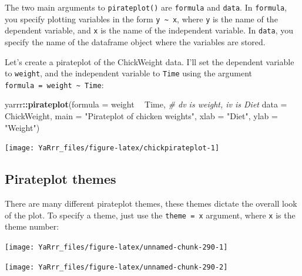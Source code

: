 \documentclass[]{book}
\newenvironment{Shaded}{\begin{snugshade}}{\end{snugshade}}
\newcommand{\KeywordTok}[1]{\textcolor[rgb]{0.13,0.29,0.53}{\textbf{#1}}}
\newcommand{\DataTypeTok}[1]{\textcolor[rgb]{0.13,0.29,0.53}{#1}}
\newcommand{\StringTok}[1]{\textcolor[rgb]{0.31,0.60,0.02}{#1}}
\newcommand{\CommentTok}[1]{\textcolor[rgb]{0.56,0.35,0.01}{\textit{#1}}}
\newcommand{\OperatorTok}[1]{\textcolor[rgb]{0.81,0.36,0.00}{\textbf{#1}}}
\newcommand{\NormalTok}[1]{#1}
\theoremstyle{definition}
\theoremstyle{definition}
\theoremstyle{remark}
\begin{document}
The two main arguments to \texttt{pirateplot()} are \texttt{formula} and
\texttt{data}. In \texttt{formula}, you specify plotting variables in
the form \texttt{y\ \textasciitilde{}\ x}, where \texttt{y} is the name
of the dependent variable, and \texttt{x} is the name of the independent
variable. In \texttt{data}, you specify the name of the dataframe object
where the variables are stored.

Let's create a pirateplot of the ChickWeight data. I'll set the
dependent variable to \texttt{weight}, and the independent variable to
\texttt{Time} using the argument
\texttt{formula\ =\ weight\ \textasciitilde{}\ Time}:

\begin{Shaded}
\begin{Highlighting}[]
\NormalTok{yarrr}\OperatorTok{::}\KeywordTok{pirateplot}\NormalTok{(}\DataTypeTok{formula =}\NormalTok{ weight }\OperatorTok{~}\StringTok{ }\NormalTok{Time, }\CommentTok{# dv is weight, iv is Diet}
                   \DataTypeTok{data =}\NormalTok{ ChickWeight,}
                   \DataTypeTok{main =} \StringTok{"Pirateplot of chicken weights"}\NormalTok{,}
                   \DataTypeTok{xlab =} \StringTok{"Diet"}\NormalTok{,}
                   \DataTypeTok{ylab =} \StringTok{"Weight"}\NormalTok{)}
\end{Highlighting}
\end{Shaded}

\begin{center}\texttt{[image: YaRrr\_files/figure-latex/chickpirateplot-1]} \end{center}

\subsection{Pirateplot themes}\label{pirateplot-themes}

There are many different pirateplot themes, these themes dictate the
overall look of the plot. To specify a theme, just use the
\texttt{theme\ =\ x} argument, where \texttt{x} is the theme number:

\begin{center}\texttt{[image: YaRrr\_files/figure-latex/unnamed-chunk-290-1]} \end{center}

\begin{center}\texttt{[image: YaRrr\_files/figure-latex/unnamed-chunk-290-2]} \end{center}
\end{document}
